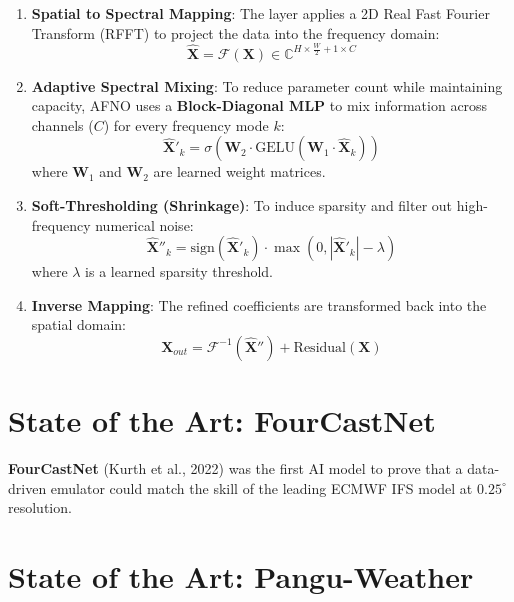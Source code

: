 \begin{enumerate}
    \item \textbf{Spatial to Spectral Mapping}: The layer applies a 2D Real Fast Fourier Transform (RFFT) to project the data into the frequency domain:
    \begin{equation}
    \hat{\mathbf{X}} = \mathcal{F}(\mathbf{X}) \in \mathbb{C}^{H \times \frac{W}{2}+1 \times C}
    \end{equation}
    \item \textbf{Adaptive Spectral Mixing}: To reduce parameter count while maintaining capacity, AFNO uses a \textbf{Block-Diagonal MLP} to mix information across channels ($C$) for every frequency mode $k$:
    \begin{equation}
    \hat{\mathbf{X}}'_k = \sigma(\mathbf{W}_2 \cdot \text{GELU}(\mathbf{W}_1 \cdot \hat{\mathbf{X}}_k))
    \end{equation}
    where $\mathbf{W}_1$ and $\mathbf{W}_2$ are learned weight matrices.
    \item \textbf{Soft-Thresholding (Shrinkage)}: To induce sparsity and filter out high-frequency numerical noise:
    \begin{equation}
    \hat{\mathbf{X}}''_k = \text{sign}(\hat{\mathbf{X}}'_k) \cdot \max(0, |\hat{\mathbf{X}}'_k| - \lambda)
    \end{equation}
    where $\lambda$ is a learned sparsity threshold.
    \item \textbf{Inverse Mapping}: The refined coefficients are transformed back into the spatial domain:
    \begin{equation}
    \mathbf{X}_{out} = \mathcal{F}^{-1}(\hat{\mathbf{X}}'') + \text{Residual}(\mathbf{X})
    \end{equation}
\end{enumerate}

\section{State of the Art: FourCastNet}

\textbf{FourCastNet} (Kurth et al., 2022) was the first AI model to prove that a data-driven emulator could match the skill of the leading ECMWF IFS model at $0.25^\circ$ resolution. 

\section{State of the Art: Pangu-Weather}

